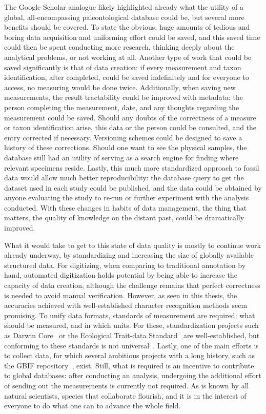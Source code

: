 \documentclass[english,twoside,openright]{UH_DS_MSc}
\begin{document}
The Google Scholar analogue likely highlighted already what the utility of a global, all-encompassing paleontological database could be, but several more benefits should be covered. To state the obvious, huge amounts of tedious and boring data acquisition and uniforming effort could be saved, and this saved time could then be spent conducting more research, thinking deeply about the analytical problems, or not working at all. Another type of work that could be saved significantly is that of data creation: if every measurement and taxon identification, after completed, could be saved indefinitely and for everyone to access, no measuring would be done twice. Additionally, when saving new measurements, the result tractability could be improved with metadata: the person completing the measurement, date, and any thoughts regarding the measurement could be saved. Should any doubts of the correctness of a measure or taxon identification arise, this data or the person could be consulted, and the entry corrected if necessary. Versioning schemes could be designed to save a history of these corrections. Should one want to see the physical samples, the database still had an utility of serving as a search engine for finding where relevant specimens reside. Lastly, this much more standardized approach to fossil data would allow much better reproducibility: the database query to get the dataset used in each study could be published, and the data could be obtained by anyone evaluating the study to re-run or further experiment with the analysis conducted. With these changes in habits of data management, the thing that matters, the quality of knowledge on the distant past, could be dramatically improved.

What it would take to get to this state of data quality is mostly to continue work already underway, by standardizing and increasing the size of globally available structured data.
For digitizing, when comparing to traditional annotation by hand, automated digitization holds potential by being able to increase the capacity of data creation, although the challenge remains that perfect correctness is needed to avoid manual verification. However, as seen in this thesis, the accuracies achieved with well-established character recognition methods seem promising.
To unify data formats, standards of measurement are required: what should be measured, and in which units. For these, standardization projects such as Darwin Core~\cite{darwincore} or the Ecological Trait-data Standard~\cite{ets-trait-data-standard} are well-established, but conforming to these standards is not universal~\cite{groomImprovedStandardizationTranscribed2019}.
Lastly, one of the main efforts is to collect data, for which several ambitious projects with a long history, such as the GBIF repository~\cite{gbif}, exist.
 Still, what is required is an incentive to contribute to global databases: after 
conducting an analysis, undergoing the additional effort of sending out the measurements is currently not required. As is known by all natural scientists, species that collaborate flourish, and it is in the interest of everyone to do what one can to advance the whole field.
\end{document}
